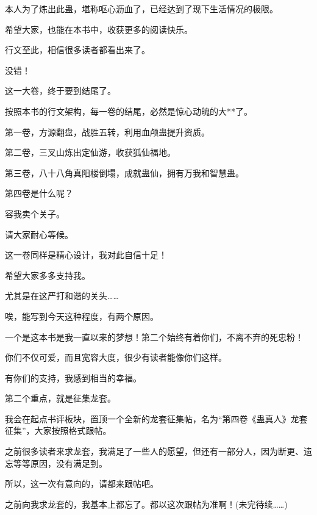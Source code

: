 \begin{this_body}
本人为了炼出此蛊，堪称呕心沥血了，已经达到了现下生活情况的极限。

希望大家，也能在本书中，收获更多的阅读快乐。

行文至此，相信很多读者都看出来了。

没错！

这一大卷，终于要到结尾了。

按照本书的行文架构，每一卷的结尾，必然是惊心动魄的大**了。

第一卷，方源翻盘，战胜五转，利用血颅蛊提升资质。

第二卷，三叉山炼出定仙游，收获狐仙福地。

第三卷，八十八角真阳楼倒塌，成就蛊仙，拥有万我和智慧蛊。

第四卷是什么呢？

容我卖个关子。

请大家耐心等候。

这一卷同样是精心设计，我对此自信十足！

希望大家多多支持我。

尤其是在这严打和谐的关头……

唉，能写到今天这种程度，有两个原因。

一个是这本书是我一直以来的梦想！第二个始终有着你们，不离不弃的死忠粉！

你们不仅可爱，而且宽容大度，很少有读者能像你们这样。

有你们的支持，我感到相当的幸福。

第二个重点，就是征集龙套。

我会在起点书评板块，置顶一个全新的龙套征集帖，名为“第四卷《蛊真人》龙套征集”，大家按照格式跟帖。

之前很多读者来求龙套，我满足了一些人的愿望，但还有一部分人，因为断更、遗忘等等原因，没有满足到。

所以，这一次有意向的，请都来跟帖吧。

之前向我求龙套的，我基本上都忘了。都以这次跟帖为准啊！(未完待续……)

\end{this_body}

